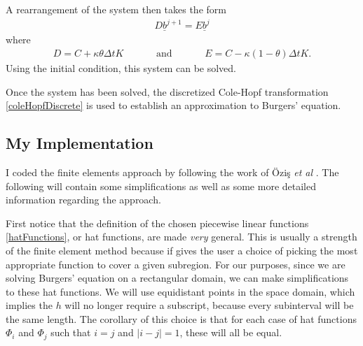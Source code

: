 \documentclass[undefended]{sfuthesis}
\begin{document}
A rearrangement of the system then takes the form
\begin{align}
	D \underline{b}^{j + 1} = E \underline{b}^j \label{finiteElementEquation}
\end{align}
where
\begin{align*}
	D = C + \kappa \theta \Delta t K \quad\quad\quad \text{ and } \quad\quad\quad E = C - \kappa (1 - \theta) \Delta t K.
\end{align*}
Using the initial condition, this system can be solved. 

Once the system has been solved, the discretized Cole-Hopf transformation \eqref{coleHopfDiscrete} is used to establish an approximation to Burgers' equation. 

\subsection{My Implementation}

I coded the finite elements approach by following the work of \"Ozi\c{s} \textit{et al} \cite{burgerFiniteElement}. The following will contain some simplifications as well as some more detailed information regarding the approach.

First notice that the definition of the chosen piecewise linear functions \eqref{hatFunctions}, or hat functions, are made \textit{very} general. This is usually a strength of the finite element method because if gives the user a choice of picking the most appropriate function to cover a given subregion. For our purposes, since we are solving Burgers' equation on a rectangular domain, we can make simplifications to these hat functions. We will use equidistant points in the space domain, which implies the $h$ will no longer require a subscript, because every subinterval will be the same length. The corollary of this choice is that for each case of hat functions $\Phi_i$ and $\Phi_j$ such that $i = j$ and $|i - j| = 1$, these will all be equal.
\end{document}
